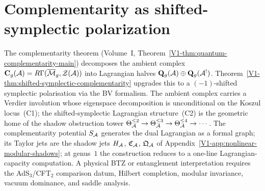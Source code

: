 
\providecommand{\MC}{\mathrm{MC}}
\providecommand{\Defcyc}{\mathrm{Def}_{\mathrm{cyc}}}
\providecommand{\Definfmod}{\mathrm{Def}^{\mathrm{mod}}_\infty}
\providecommand{\Sh}{\mathrm{Sh}}
\providecommand{\gr}{\operatorname{gr}}
\providecommand{\id}{\mathrm{id}}
\providecommand{\Tr}{\operatorname{Tr}}
\providecommand{\Sym}{\operatorname{Sym}}
\providecommand{\Hom}{\operatorname{Hom}}
\providecommand{\End}{\operatorname{End}}
\providecommand{\Spec}{\operatorname{Spec}}
\providecommand{\Res}{\operatorname{Res}}
\providecommand{\rank}{\operatorname{rank}}
\providecommand{\ad}{\operatorname{ad}}
\providecommand{\Fred}{\operatorname{Fred}}
\providecommand{\Map}{\operatorname{Map}}
\providecommand{\RGamma}{R\Gamma}
\providecommand{\Perf}{\operatorname{Perf}}
\providecommand{\BTZ}{\mathrm{BTZ}}

\section{Complementarity as shifted-symplectic polarization}
\label{ch:thqg-symplectic-polarization}%

The complementarity theorem (Volume~I, Theorem~\ref{V1-thm:quantum-complementarity-main})
decomposes the ambient complex
$\mathbf{C}_g(\cA) = \RGamma(\overline{\mathcal{M}}_g,
\mathcal{Z}(\cA))$ into Lagrangian halves
$\mathbf{Q}_g(\mathcal{A}) \oplus \mathbf{Q}_g(\mathcal{A}^!)$.
Theorem~\ref{V1-thm:shifted-symplectic-complementarity} upgrades
this to a $(-1)$-shifted symplectic polarisation via the BV
formalism. The ambient complex carries a Verdier involution whose
eigenspace decomposition is unconditional on the Koszul
locus~(C1); the shifted-symplectic Lagrangian structure~(C2) is
the geometric home of the shadow obstruction tower
$\Theta_{\mathcal{A}}^{\le 2} \to \Theta_{\mathcal{A}}^{\le 3} \to \Theta_{\mathcal{A}}^{\le 4}
\to \cdots$. The complementarity potential $S_{\mathcal{A}}$ generates the
dual Lagrangian as a formal graph; its Taylor jets are the shadow
jets $H_{\mathcal{A}}$, $\mathfrak{C}_{\mathcal{A}}$, $\mathfrak{Q}_{\mathcal{A}}$ of
Appendix~\ref*{V1-app:nonlinear-modular-shadows}; at genus~$1$
the construction reduces to a one-line Lagrangian-capacity
computation.  A physical BTZ or entanglement interpretation requires
the AdS$_3$/CFT$_2$ comparison datum, Hilbert completion, modular
invariance, vacuum dominance, and saddle analysis.

